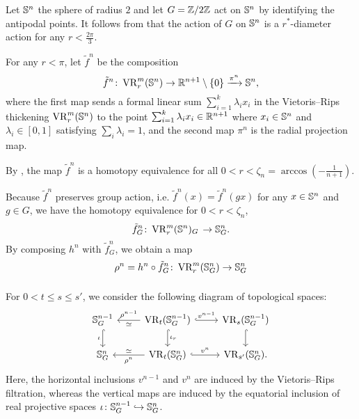 \subsubsection{}

Let $\mathbb{S}^n$ the sphere of radius $2$ and let $G=\mathbb{Z}/2\mathbb{Z}$ act on $\mathbb{S}^n$ by identifying the antipodal points.
It follows from \cite[Corollary]{adams2022metric} that the action of $G$ on $\mathbb{S}^n$ is a $r^*$-diameter action for any $r<\tfrac{2\pi}{3}$.

For any $r<\pi$, let $\tilde{f}^n$ be the composition
\[
    \tilde{f}^n \colon \operatorname{VR}_r^m(\mathbb{S}^n) \to \mathbb{R}^{n+1} \setminus \{0\} \xrightarrow{\pi^n} \mathbb{S}^n,
\]
where the first map sends a formal linear sum $\sum_{i=1}^k \lambda_i x_i$ in the Vietoris--Rips thickening $\operatorname{VR}_r^m(\mathbb{S}^n)$ to the point $\sum_{i=1}^k \lambda_i x_i \in \mathbb{R}^{n+1}$ where $x_i \in \mathbb{S}^n$ and $\lambda_i \in [0,1]$ satisfying $\sum_i\lambda_i=1$, and the second map $\pi^n$ is the radial projection map.

By \cite[Proposition 5.3]{adamaszek2018metric}, the map $\tilde{f}^n$ is a homotopy equivalence for all $0<r<\zeta_n=\arccos{(-\tfrac{1}{n+1})}$.

Because $\tilde{f}^n$ preserves group action, i.e. $\tilde{f}^n(x) = \tilde{f}^n(gx)$ for any $x\in \mathbb{S}^n$ and $g\in G$, we have the homotopy equivalence for $0<r<\zeta_n$, %
\[
\tilde{f}^n_G \colon 
\operatorname{VR}_r^m(\mathbb{S}^n)_G \, 
\to \mathbb{S}^n_G.
\]
By composing $h^n$ with $\tilde{f}^n_G$, we obtain a map 
\[
\rho^n = h^n \circ \tilde{f}^n_G 
\colon \operatorname{VR}_r^m(\mathbb{S}^n_G) \to \mathbb{S}^n_G
\]

\subsubsection{} 

For $0<t\leq s \leq s'$, we consider the following diagram of topological spaces:
\begin{equation}\label{d:fundamental_bars_diagram}
    \begin{tikzcd}
        \bS^{n-1}_G
        \ar[d, hook,"{\iota}" left]
        &
        \VR_t(\bS^{n-1}_G)
        \ar[d, hook,"\iota_r"]
        \ar[l, "\rho^{n-1}" above, "\simeq" below]
        \ar[r, hook, "v^{n-1}"]
        &
        \VR_{s}(\bS^{n-1}_G)
        \ar[d, hook]
        \\
        \bS^{n}_G
        &
        \VR_t(\bS^{n}_G)
        \ar[l, "\rho^n" below, "\simeq" above]
        \ar[r, hook, "v^{n}"]
        &
        \VR_{s'}(\bS^{n}_G).
    \end{tikzcd}
\end{equation}
Here, the horizontal inclusions $v^{n-1}$ and $v^n$ are induced by the Vietoris--Rips filtration, whereas the vertical maps are induced by the equatorial inclusion of real projective spaces $\iota \colon \mathbb{S}^{n-1}_G \hookrightarrow \mathbb{S}^{n}_G$.

